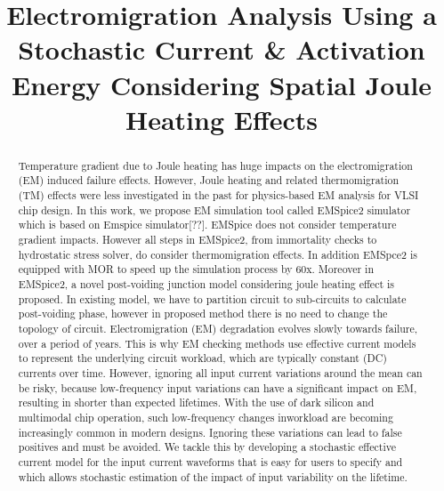 \documentclass[conference]{IEEEtran}
\begin{document}
\title{Electromigration Analysis Using a Stochastic Current \& Activation Energy Considering Spatial Joule Heating
Effects}


\maketitle
\raggedbottom
\begin{abstract}
  
  Temperature gradient due to Joule heating has huge impacts on the
  electromigration (EM) induced failure effects. However, Joule
  heating and related thermomigration (TM) effects were less
  investigated in the past for physics-based EM analysis for VLSI chip
  design. In this work, we propose EM simulation tool called EMSpice2
  simulator which is based on Emspice simulator[??]. EMSpice does not consider temperature gradient impacts. However all steps in EMSpice2,
  from immortality checks to hydrostatic stress solver, do consider thermomigration effects. In addition EMSpce2 is equipped with MOR to speed up the simulation process by 60x. Moreover in EMSpice2, a novel post-voiding junction model
  considering joule heating effect is proposed.  In existing model, we have to
  partition circuit to sub-circuits to calculate post-voiding phase,
  however in proposed method there is no need to change the topology
  of circuit.
Electromigration (EM) degradation evolves slowly towards failure,
over a period of years. This is why EM checking methods use effective
current models to represent the underlying circuit workload,
which are typically constant (DC) currents over time. However,
ignoring all input current variations around the mean can be
risky, because low-frequency input variations can have a significant
impact on EM, resulting in shorter than expected lifetimes.
With the use of dark silicon and multimodal chip operation, such
low-frequency changes inworkload are becoming increasingly common
in modern designs. Ignoring these variations can lead to false
positives and must be avoided. We tackle this by developing a stochastic
effective current model for the input current waveforms
that is easy for users to specify and which allows stochastic estimation
of the impact of input variability on the lifetime.

\end{abstract}
\end{document}
